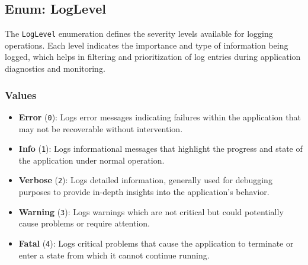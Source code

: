 \documentclass[12pt]{article}
\begin{document}
\newpage
\subsection*{Enum: LogLevel}

The \texttt{LogLevel} enumeration defines the severity levels available for logging operations. Each level indicates the importance and type of information being logged, which helps in filtering and prioritization of log entries during application diagnostics and monitoring.

\subsubsection*{Values}

\begin{itemize}
    \item \textbf{Error} (\texttt{0}): Logs error messages indicating failures within the application that may not be recoverable without intervention.
    \item \textbf{Info} (\texttt{1}): Logs informational messages that highlight the progress and state of the application under normal operation.
    \item \textbf{Verbose} (\texttt{2}): Logs detailed information, generally used for debugging purposes to provide in-depth insights into the application's behavior.
    \item \textbf{Warning} (\texttt{3}): Logs warnings which are not critical but could potentially cause problems or require attention.
    \item \textbf{Fatal} (\texttt{4}): Logs critical problems that cause the application to terminate or enter a state from which it cannot continue running.
\end{itemize}
\end{document}
